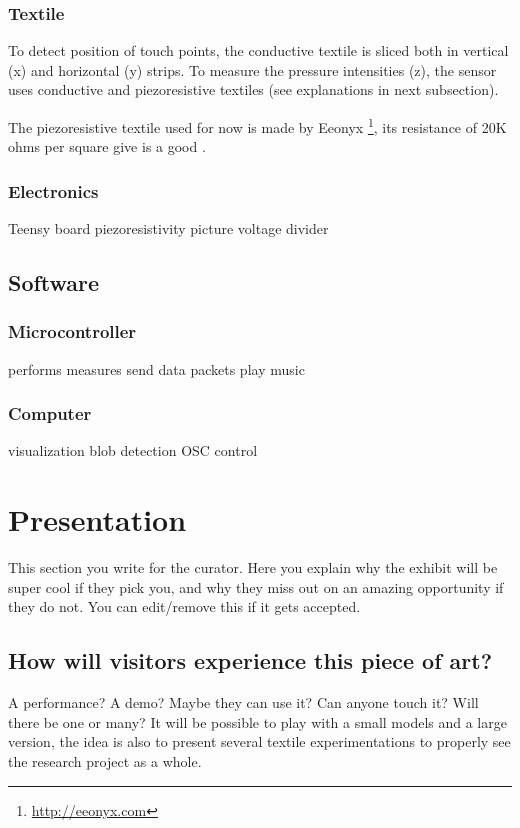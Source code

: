 \documentclass{sigchi-ext}
\begin{document}
\subsubsection{Textile}

To detect position of touch points, the conductive textile is sliced both in vertical (x) and horizontal (y) strips.
To measure the pressure intensities (z), the sensor uses conductive and piezoresistive textiles (see explanations in next subsection).

The piezoresistive textile used for now is made by Eeonyx \footnote{\url{http://eeonyx.com}}, its resistance of 20K ohms per square give is a good .


\subsubsection{Electronics}

Teensy board
piezoresistivity picture
voltage divider


\subsection{Software}

\subsubsection{Microcontroller}

performs measures
send data packets
play music

\subsubsection{Computer}

visualization
blob detection
OSC control


\section{Presentation}

This section you write for the curator. Here you explain why the exhibit will be super cool if they pick you, and why they miss out on an amazing opportunity if they do not. You can edit/remove this if it gets accepted.


\subsection{How will visitors experience this piece of art?}
A performance? A demo? Maybe they can use it? Can anyone touch it? Will there be one or many?
It will be possible to play with a small models and a large version, the idea is also to present several textile experimentations to properly see the research project as a whole.
\end{document}
